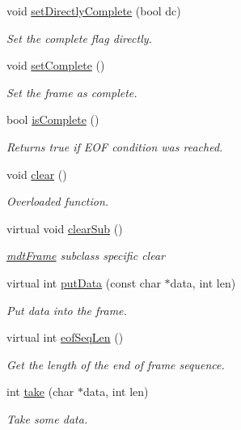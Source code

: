 \begin{DoxyCompactItemize}
void \hyperlink{classmdt_frame_abfd6de396626f01ebf972b7d6cd26957}{set\-Directly\-Complete} (bool dc)
\begin{DoxyCompactList}\small\item\em Set the complete flag directly. \end{DoxyCompactList}\item 
void \hyperlink{classmdt_frame_ab8db9882c095091109115afb8e448b37}{set\-Complete} ()
\begin{DoxyCompactList}\small\item\em Set the frame as complete. \end{DoxyCompactList}\item 
bool \hyperlink{classmdt_frame_a2a8fb9f36c941282881bba0c538d1ce5}{is\-Complete} ()
\begin{DoxyCompactList}\small\item\em Returns true if E\-O\-F condition was reached. \end{DoxyCompactList}\item 
void \hyperlink{classmdt_frame_acdf8a921a3f36ca91af88b55b90febdc}{clear} ()
\begin{DoxyCompactList}\small\item\em Overloaded function. \end{DoxyCompactList}\item 
virtual void \hyperlink{classmdt_frame_aecc64d3846dee0049ee7b10b73a402f4}{clear\-Sub} ()
\begin{DoxyCompactList}\small\item\em \hyperlink{classmdt_frame}{mdt\-Frame} subclass specific clear \end{DoxyCompactList}\item 
virtual int \hyperlink{classmdt_frame_ae63af784d2fc54430ea5db4dc80b7ec8}{put\-Data} (const char $\ast$data, int len)
\begin{DoxyCompactList}\small\item\em Put data into the frame. \end{DoxyCompactList}\item 
virtual int \hyperlink{classmdt_frame_a0e0dcfb9d284ac0dae550db33f0fbece}{eof\-Seq\-Len} ()
\begin{DoxyCompactList}\small\item\em Get the length of the end of frame sequence. \end{DoxyCompactList}\item 
int \hyperlink{classmdt_frame_a36e4b85a3c671902ac3c8cc318ca726c}{take} (char $\ast$data, int len)
\begin{DoxyCompactList}\small\item\em Take some data. \end{DoxyCompactList}\item 

\end{DoxyCompactItemize}
